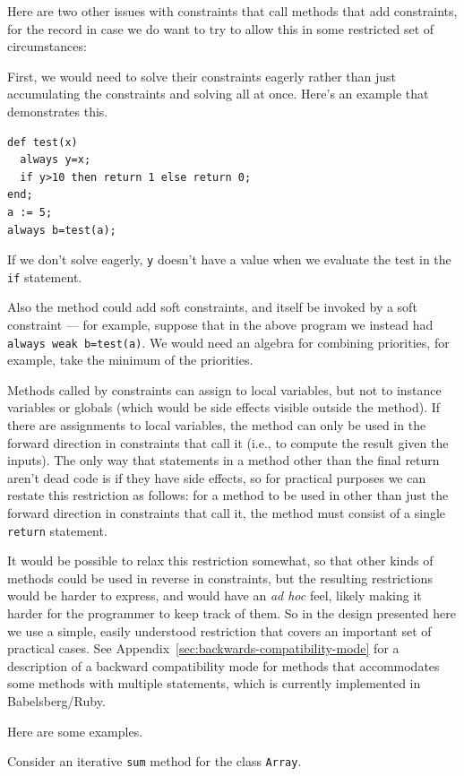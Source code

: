 \documentclass{article}
\begin{document}
Here are two other issues with constraints that call methods that add
constraints, for the record in case we do want to try to allow this in
some restricted set of circumstances:

First, we would need to solve their constraints eagerly rather than
just accumulating the constraints and solving all at once.  Here's an
example that demonstrates this.

\begin{verbatim}
def test(x)
  always y=x;
  if y>10 then return 1 else return 0;
end;
a := 5;
always b=test(a);
\end{verbatim}
If we don't solve eagerly, \verb|y| doesn't have a value when we
evaluate the test in the \verb|if| statement.

Also the method could add soft constraints, and itself be invoked by a
soft constraint --- for example, suppose that in the above program we
instead had \verb|always weak b=test(a)|.  We would need an algebra
for combining priorities, for example, take the minimum of the
priorities.

Methods called by constraints can assign to local variables, but not
to instance variables or globals (which would be side effects visible
outside the method).  If there are assignments to local variables, the
method can only be used in the forward direction in constraints that
call it (i.e., to compute the result given the inputs).  The only way
that statements in a method other than the final return aren't dead
code is if they have side effects, so for practical purposes we can
restate this restriction as follows: for a method to be used in other
than just the forward direction in constraints that call it, the
method must consist of a single \verb|return| statement.  

It would be possible to relax this restriction somewhat, so that other
kinds of methods could be used in reverse in constraints, but the
resulting restrictions would be harder to express, and would have an
\emph{ad hoc} feel, likely making it harder for the programmer to keep
track of them.  So in the design presented here we use a simple,
easily understood restriction that covers an important set of
practical cases.  See Appendix~\ref{sec:backwards-compatibility-mode}
for a description of a backward compatibility mode for methods that
accommodates some methods with multiple statements, which is currently
implemented in Babelsberg/Ruby.

Here are some examples.

Consider an iterative \verb|sum| method for
the class \verb|Array|.
\end{document}
